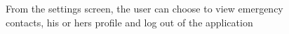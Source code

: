 \documentclass[12pt, a4paper, onecolumn]{article}
\begin{document}
	\begin{figure}[H]
		\centering
		\caption{From the settings screen, the user can choose to view emergency contacts, his or hers profile and log out of the application}%
		\label{fig:settings-screen}%
	\end{figure}
	
\end{document}
